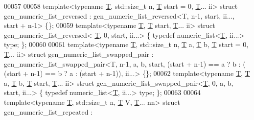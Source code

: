 \begin{DoxyCode}
00057 
00058 \textcolor{keyword}{template}<\textcolor{keyword}{typename} \hyperlink{group___sparse_core___module_class_eigen_1_1_triplet}{T}, std::size\_t n, \hyperlink{group___sparse_core___module_class_eigen_1_1_triplet}{T} start = 0, \hyperlink{group___sparse_core___module_class_eigen_1_1_triplet}{T}... ii> \textcolor{keyword}{struct }gen\_numeric\_list\_reversed              
             : gen\_numeric\_list\_reversed<T, n-1, start, ii..., start + n-1> \{\};
00059 \textcolor{keyword}{template}<\textcolor{keyword}{typename} \hyperlink{group___sparse_core___module_class_eigen_1_1_triplet}{T}, \hyperlink{group___sparse_core___module_class_eigen_1_1_triplet}{T} start, \hyperlink{group___sparse_core___module_class_eigen_1_1_triplet}{T}... ii>                    \textcolor{keyword}{struct }gen\_numeric\_list\_reversed<
      \hyperlink{group___sparse_core___module_class_eigen_1_1_triplet}{T}, 0, start, ii...> \{ \textcolor{keyword}{typedef} numeric\_list<\hyperlink{group___sparse_core___module_class_eigen_1_1_triplet}{T}, ii...> type; \};
00060 
00061 \textcolor{keyword}{template}<\textcolor{keyword}{typename} \hyperlink{group___sparse_core___module_class_eigen_1_1_triplet}{T}, std::size\_t n, \hyperlink{group___sparse_core___module_class_eigen_1_1_triplet}{T} a, \hyperlink{group___sparse_core___module_class_eigen_1_1_triplet}{T} b, \hyperlink{group___sparse_core___module_class_eigen_1_1_triplet}{T} start = 0, \hyperlink{group___sparse_core___module_class_eigen_1_1_triplet}{T}... ii> \textcolor{keyword}{struct }
      gen\_numeric\_list\_swapped\_pair                           : gen\_numeric\_list\_swapped\_pair<T, n-1, a, b, start, (start + n-1) == a ? b : (
      (start + n-1) == b ? a : (start + n-1)), ii...> \{\};
00062 \textcolor{keyword}{template}<\textcolor{keyword}{typename} \hyperlink{group___sparse_core___module_class_eigen_1_1_triplet}{T}, \hyperlink{group___sparse_core___module_class_eigen_1_1_triplet}{T} a, \hyperlink{group___sparse_core___module_class_eigen_1_1_triplet}{T} b, \hyperlink{group___sparse_core___module_class_eigen_1_1_triplet}{T} start, \hyperlink{group___sparse_core___module_class_eigen_1_1_triplet}{T}... ii>                    \textcolor{keyword}{struct }
      gen\_numeric\_list\_swapped\_pair<\hyperlink{group___sparse_core___module_class_eigen_1_1_triplet}{T}, 0, a, b, start, ii...> \{ \textcolor{keyword}{typedef} numeric\_list<\hyperlink{group___sparse_core___module_class_eigen_1_1_triplet}{T}, ii...> type; \};
00063 
00064 \textcolor{keyword}{template}<\textcolor{keyword}{typename} \hyperlink{group___sparse_core___module_class_eigen_1_1_triplet}{T}, std::size\_t n, \hyperlink{group___sparse_core___module_class_eigen_1_1_triplet}{T} V, \hyperlink{group___sparse_core___module_class_eigen_1_1_triplet}{T}... nn> \textcolor{keyword}{struct }gen\_numeric\_list\_repeated                 : 

\end{DoxyCode}
